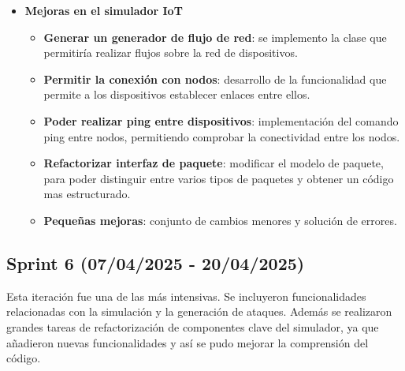 \begin{itemize}
    \item \textbf{Mejoras en el simulador IoT}
    \begin{itemize}
        \item \textbf{Generar un generador de flujo de red}: se implemento la clase que permitiría realizar flujos sobre la red de dispositivos.
        \item \textbf{Permitir la conexión con nodos}: desarrollo de la funcionalidad que permite a los dispositivos establecer enlaces entre ellos.
        \item \textbf{Poder realizar ping entre dispositivos}: implementación del comando ping entre nodos, permitiendo comprobar la conectividad entre los nodos.
        \item \textbf{Refactorizar interfaz de paquete}: modificar el modelo de paquete, para poder distinguir entre varios tipos de paquetes y obtener un código mas estructurado.
        \item \textbf{Pequeñas mejoras}: conjunto de cambios menores y solución de errores.
    \end{itemize}
\end{itemize}

\subsection{Sprint 6 (07/04/2025 - 20/04/2025)}
\label{subsec:SextoSprint}
Esta iteración fue una de las más intensivas. Se incluyeron funcionalidades relacionadas con la simulación y la generación de ataques. Además se realizaron grandes tareas de refactorización de componentes clave del simulador, ya que añadieron nuevas funcionalidades y así se pudo mejorar la comprensión del código.

